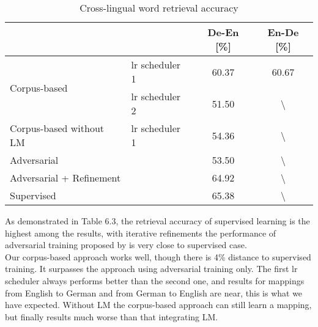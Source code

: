\begin{table}[H]
	\centering
	\begin{tabular}{llcc}
		\hline
		&                & De-En [\%]& En-De [\%]            \\ \hline
		\multirow{2}{*}{Corpus-based } & lr scheduler 1 & 60.37 & 60.67            \\ \cline{2-4} 
		& lr scheduler 2 & 51.50 & \textbackslash{} \\ \hline
		Corpus-based without LM              & lr scheduler 1 & 54.36 &        \textbackslash{}           \\ \hline
		Adversarial                            &                & 53.50 &       \textbackslash{}   \\ \hline
		Adversarial + Refinement               &                & 64.92 & \textbackslash{}    \\ \hline
		Supervised                             &                & 65.38 & \textbackslash{}  \\ \hline
	\end{tabular}
	\caption{Cross-lingual word retrieval accuracy}
\end{table}
As demonstrated in Table 6.3, the retrieval accuracy of supervised learning is the highest among the results, with iterative refinements the performance of adversarial training proposed by \cite{DBLP:journals/corr/abs-1710-04087} is very close to supervised case. \\
Our corpus-based approach works well, though there is 4\% distance to supervised training. It surpasses the approach using adversarial training only. The first lr scheduler always performs better than the second one, and results for mappings from English to German and from German to English are near, this is what we have expected.  Without LM the corpus-based approach can still learn a mapping, but finally results much worse than that integrating LM.\\


